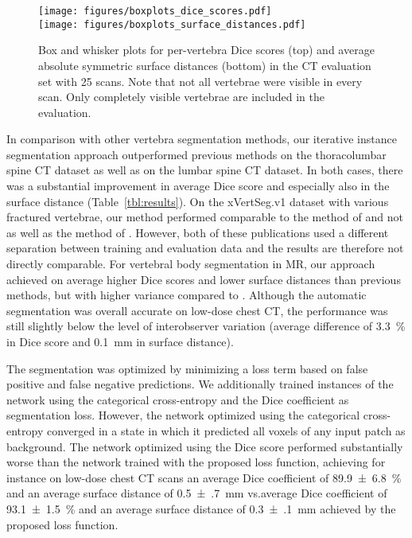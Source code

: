 \documentclass[authoryear,5p,final,times]{elsarticle}
\begin{document}
	\begin{figure}[t]
		\centering
		\texttt{[image: figures/boxplots\_dice\_scores.pdf]}
		\\
		\texttt{[image: figures/boxplots\_surface\_distances.pdf]}
		\caption{Box and whisker plots for per-vertebra Dice scores (top) and average absolute symmetric surface distances (bottom) in the CT evaluation set with 25 scans. Note that not all vertebrae were visible in every scan. Only completely visible vertebrae are included in the evaluation.}
		\label{fig:boxplots}
	\end{figure}

	In comparison with other vertebra segmentation methods, our iterative instance segmentation approach outperformed previous methods on the thoracolumbar spine CT dataset as well as on the lumbar spine CT dataset. In both cases, there was a substantial improvement in average Dice score and especially also in the surface distance (Table~\ref*{tbl:results}). On the xVertSeg.v1 dataset with various fractured vertebrae, our method performed comparable to the method of \citet{Sekuboyina2017} and not as well as the method of \citet{Janssens2018}. However, both of these publications used a different separation between training and evaluation data and the results are therefore not directly comparable. For vertebral body segmentation in MR, our approach achieved on average higher Dice scores and lower surface distances than previous methods, but with higher variance compared to \citet{Korez2016}.
	Although the automatic segmentation was overall accurate on low-dose chest CT, the performance was still slightly below the level of interobserver variation (average difference of \SI{3.3}{\percent} in Dice score and \SI{0.1}{\milli\meter} in surface distance).

	The segmentation was optimized by minimizing a loss term based on false positive and false negative predictions. We additionally trained instances of the network using the categorical cross-entropy and the Dice coefficient as segmentation loss. However, the network optimized using the categorical cross-entropy converged in a state in which it predicted all voxels of any input patch as background. The network optimized using the Dice score performed substantially worse than the network trained with the proposed loss function, achieving for instance on low-dose chest CT scans an average Dice coefficient of \SI{89.9(68)}{\percent} and an average surface distance of \SI{0.5(7)}{\milli\meter} vs.\an average Dice coefficient of \SI{93.1(15)}{\percent} and an average surface distance of \SI{0.3(1)}{\milli\meter} achieved by the proposed loss function.
\end{document}

